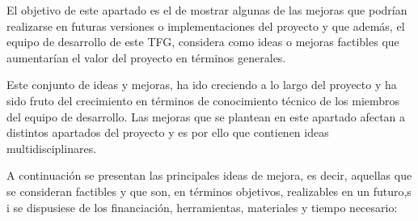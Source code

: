 El objetivo de este apartado es el de mostrar algunas de las mejoras que podrían realizarse en futuras versiones o implementaciones del proyecto y que además, el equipo de desarrollo de este TFG, considera como ideas o mejoras factibles que aumentarían el valor del proyecto en términos generales.

Este conjunto de ideas y mejoras, ha ido creciendo a lo largo del proyecto y ha sido fruto del crecimiento en términos de conocimiento técnico de los miembros del equipo de desarrollo. Las mejoras que se plantean en este apartado afectan a distintos apartados del proyecto y es por ello que contienen ideas multidisciplinares.

A continuación se presentan las principales ideas de mejora, es decir, aquellas que se consideran factibles y que son, en términos objetivos, realizables en un futuro,s i se dispusiese de los financiación, herramientas, materiales y tiempo necesario:


